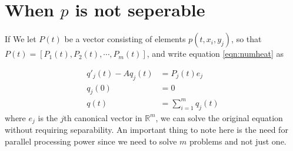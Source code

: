 \section{When $p$ is not seperable}
If We let $P(t)$ be a vector consisting of elements $p(t, x_i, y_j)$, so that $P(t) = [P_1(t),P_2(t),\cdots, P_m(t)]$, and write equation \eqref{eqn:numheat} as

\begin{equation}
\begin{aligned}
q'_j(t) -A q_j(t) &= P_j(t) e_j \\
q_j(0) &= 0\\
q(t) &= \sum \limits_{i = 1}^m q_j(t)
\end{aligned}
\end{equation}
where $e_j$ is the $j$th canonical vector in $\mathbb{R}^{m}$, we can solve the original equation without requiring separability. 
An important thing to note here is the need for parallel processing power since we need to solve $m$ problems and not just one.
